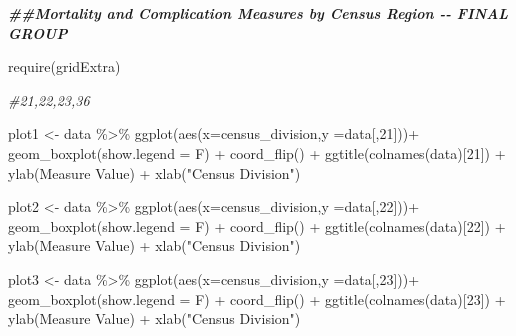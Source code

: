 \documentclass[
]{article}
\newenvironment{Shaded}{\begin{snugshade}}{\end{snugshade}}
\newcommand{\AttributeTok}[1]{\textcolor[rgb]{0.77,0.63,0.00}{#1}}
\newcommand{\CommentTok}[1]{\textcolor[rgb]{0.56,0.35,0.01}{\textit{#1}}}
\newcommand{\DecValTok}[1]{\textcolor[rgb]{0.00,0.00,0.81}{#1}}
\newcommand{\DocumentationTok}[1]{\textcolor[rgb]{0.56,0.35,0.01}{\textbf{\textit{#1}}}}
\newcommand{\FunctionTok}[1]{\textcolor[rgb]{0.00,0.00,0.00}{#1}}
\newcommand{\NormalTok}[1]{#1}
\newcommand{\OtherTok}[1]{\textcolor[rgb]{0.56,0.35,0.01}{#1}}
\newcommand{\SpecialCharTok}[1]{\textcolor[rgb]{0.00,0.00,0.00}{#1}}
\newcommand{\StringTok}[1]{\textcolor[rgb]{0.31,0.60,0.02}{#1}}
\begin{document}
\begin{Shaded}
\begin{Highlighting}[]
\DocumentationTok{\#\#Mortality and Complication Measures by Census Region {-}{-} FINAL GROUP}

\FunctionTok{require}\NormalTok{(gridExtra)}

\CommentTok{\#21,22,23,36}

\NormalTok{plot1 }\OtherTok{\textless{}{-}}\NormalTok{ data  }\SpecialCharTok{\%\textgreater{}\%} \FunctionTok{ggplot}\NormalTok{(}\FunctionTok{aes}\NormalTok{(}\AttributeTok{x=}\NormalTok{census\_division,}\AttributeTok{y =}\NormalTok{data[,}\DecValTok{21}\NormalTok{]))}\SpecialCharTok{+}
  \FunctionTok{geom\_boxplot}\NormalTok{(}\AttributeTok{show.legend =}\NormalTok{ F) }\SpecialCharTok{+}
  \FunctionTok{coord\_flip}\NormalTok{() }\SpecialCharTok{+}
  \FunctionTok{ggtitle}\NormalTok{(}\FunctionTok{colnames}\NormalTok{(data)[}\DecValTok{21}\NormalTok{]) }\SpecialCharTok{+} 
  \FunctionTok{ylab}\NormalTok{(}\StringTok{\textquotesingle{}Measure Value\textquotesingle{}}\NormalTok{) }\SpecialCharTok{+} \FunctionTok{xlab}\NormalTok{(}\StringTok{"Census Division"}\NormalTok{)}


\NormalTok{plot2 }\OtherTok{\textless{}{-}}\NormalTok{ data }\SpecialCharTok{\%\textgreater{}\%} \FunctionTok{ggplot}\NormalTok{(}\FunctionTok{aes}\NormalTok{(}\AttributeTok{x=}\NormalTok{census\_division,}\AttributeTok{y =}\NormalTok{data[,}\DecValTok{22}\NormalTok{]))}\SpecialCharTok{+}
  \FunctionTok{geom\_boxplot}\NormalTok{(}\AttributeTok{show.legend =}\NormalTok{ F) }\SpecialCharTok{+}
  \FunctionTok{coord\_flip}\NormalTok{() }\SpecialCharTok{+}
  \FunctionTok{ggtitle}\NormalTok{(}\FunctionTok{colnames}\NormalTok{(data)[}\DecValTok{22}\NormalTok{]) }\SpecialCharTok{+} 
  \FunctionTok{ylab}\NormalTok{(}\StringTok{\textquotesingle{}Measure Value\textquotesingle{}}\NormalTok{) }\SpecialCharTok{+} \FunctionTok{xlab}\NormalTok{(}\StringTok{"Census Division"}\NormalTok{)}

\NormalTok{plot3 }\OtherTok{\textless{}{-}}\NormalTok{ data }\SpecialCharTok{\%\textgreater{}\%} \FunctionTok{ggplot}\NormalTok{(}\FunctionTok{aes}\NormalTok{(}\AttributeTok{x=}\NormalTok{census\_division,}\AttributeTok{y =}\NormalTok{data[,}\DecValTok{23}\NormalTok{]))}\SpecialCharTok{+}
  \FunctionTok{geom\_boxplot}\NormalTok{(}\AttributeTok{show.legend =}\NormalTok{ F) }\SpecialCharTok{+}
  \FunctionTok{coord\_flip}\NormalTok{() }\SpecialCharTok{+}
  \FunctionTok{ggtitle}\NormalTok{(}\FunctionTok{colnames}\NormalTok{(data)[}\DecValTok{23}\NormalTok{]) }\SpecialCharTok{+} 
  \FunctionTok{ylab}\NormalTok{(}\StringTok{\textquotesingle{}Measure Value\textquotesingle{}}\NormalTok{) }\SpecialCharTok{+} \FunctionTok{xlab}\NormalTok{(}\StringTok{"Census Division"}\NormalTok{)}



\end{Highlighting}
\end{Shaded}
\end{document}
